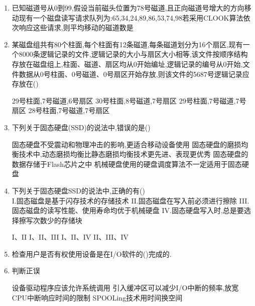 \documentclass[12pt, a4paper, oneside, UTF8]{ctexbook}
\begin{document}
\begin{enumerate}
    \item 已知磁道号从0到99,假设当前磁头位置为78号磁道,且正向磁道号增大的方向移动现有一个磁盘读写请求队列为:65,34,24,89,86,53,74,98若采用CLOOK算法依次响应这些请求,则平均移动的磁道数是
    \begin{choices}
    \end{choices}

    \item 某磁盘组共有80个柱面,每个柱面有12条磁道,每条磁道划分为16个扇区,现有一个8000条逻辑记录的文件,逻辑记录的大小与扇区大小相等,该文件按顺序结构存放在磁盘组上,柱面、磁道、扇区均从0开始编址,逻辑记录的编号从0开始,文件数据从0号柱面、0号磁道、0号扇区开始存放,则该文件的5687号逻辑记录应存放在(\qquad)
    \begin{choices}
    \task 29号柱面,7号磁道,6号扇区
    \task 30号柱面,8号磁道,7号扇区
    \task 29号柱面,7号磁道,7号扇区
    \task 28号柱面,7号磁道,7号扇区
    \end{choices}

    \item 下列关于固态硬盘(SSD)的说法中,错误的是(\qquad)
    \begin{choices}[1]
    \task 固态硬盘不受震动和物理冲击的影响,更适合移动设备使用
    \task 固态硬盘的磨损均衡技术中,动态磨损均衡比静态磨损均衡技术更先进、表现更优秀
    \task 固态硬盘的数据存储于Flash芯片之中
    \task 机械硬盘使用的硬盘调度算法不一定适用于固态硬盘
    \end{choices}

    \item 下列关于固态硬盘SSD的说法中,正确的有(\qquad)\\
    I.固态磁盘是基于闪存技术的存储技术\quad
    II.固态磁盘在写入前必须进行擦除\quad
    III.固态磁盘的读写性能、使用寿命均优于机械硬盘\quad
    IV.固态硬盘写入时,总是要选择擦写次数少的存储块
    \begin{choices}[2]
    \task I、II
    \task I、II、III
    \task I、II、IV
    \task II、III、IV
    \end{choices}

    \item 检查用户是否有权使用设备是在I/O软件的(\qquad)完成的.
    \item 判断正误
    \begin{choices}[1]
        \task 设备驱动程序应该允许系统调用
        \task 引入缓冲区可以减少I/O中断的频率,放宽CPU中断响应时间的限制
        \task SPOOLing技术用时间换空间
    \end{choices}


\end{enumerate}
\end{document}
